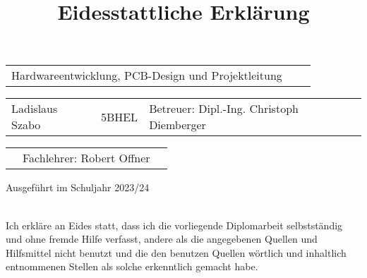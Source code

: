 \documentclass[11pt]{article}
\begin{document}
\begin{titlepage}
\begin{center}
		\hfill \break

		\begin{tabular}{p{10cm}p{1cm}l}
			Hardwareentwicklung, PCB-Design und Projektleitung \\
		\end{tabular}

		\begin{tabular}{p{3cm}p{2cm}l}
			Ladislaus Szabo & 5BHEL & Betreuer: Dipl.-Ing. Christoph Diemberger \\
		\end{tabular}

		\begin{tabular}{p{3.26cm}p{5cm}l}
			& Fachlehrer: Robert Offner 
		\end{tabular}

		\hfill \break
		\hfill \break
		\hfill \break
		\hfill \break
		\hfill \break

		Ausgeführt im Schuljahr 2023/24

	\end{center}

\end{titlepage}

\newpage


\begin{center}

	\hfill \break
	\hfill \break
	\hfill \break
	\hfill \break
	\hfill \break
	\title{\textbf{\LARGE{Eidesstattliche Erklärung}}}	
	\maketitle

\end{center}

\hfill \break
\\
Ich erkläre an Eides statt, dass ich die vorliegende Diplomarbeit selbstständig und ohne fremde Hilfe verfasst, 
andere als die angegebenen Quellen und Hilfsmittel nicht benutzt und die den benutzen Quellen wörtlich und 
inhaltlich entnommenen Stellen als solche erkenntlich gemacht habe.\\
\hfill \break
\hfill \break
\hfill \break
\end{document}
